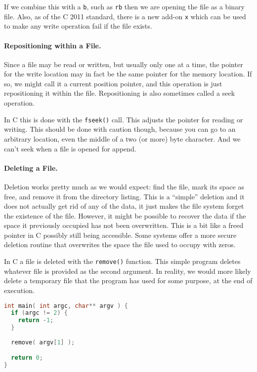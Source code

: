 If we combine this with a \texttt{b}, such as \texttt{rb} then we are opening the file as a binary file. Also, as of the C 2011 standard, there is a new add-on \texttt{x} which can be used to make any write operation fail if the file exists.

\paragraph{Repositioning within a File.} Since a file may be read or written, but usually only one at a time, the pointer for the write location may in fact be the same pointer for the memory location. If so, we might call it a current position pointer, and this operation is just repositioning it within the file. Repositioning is also sometimes called a seek operation.

In C this is done with the \texttt{fseek()} call. This adjusts the pointer for reading or writing. This should be done with caution though, because you can go to an arbitrary location, even the middle of a two (or more) byte character. And we can't seek when a file is opened for append.

\paragraph{Deleting a File.} Deletion works pretty much as we would expect: find the file, mark its space as free, and remove it from the directory listing. This is a ``simple'' deletion and it does not actually get rid of any of the data, it just makes the file system forget the existence of the file. However, it might be possible to recover the data if the space it previously occupied has not been overwritten. This is a bit like a freed pointer in C possibly still being accessible. Some systems offer a more secure deletion routine that overwrites the space the file used to occupy with zeros.

In C a file is deleted with the \texttt{remove()} function. This simple program deletes whatever file is provided as the second argument. In reality, we would more likely delete a temporary file that the program has used for some purpose, at the end of execution.

\begin{lstlisting}[language=C]
int main( int argc, char** argv ) {
  if (argc != 2) {
    return -1;
  }
  
  remove( argv[1] );

  return 0;
}    
\end{lstlisting}


